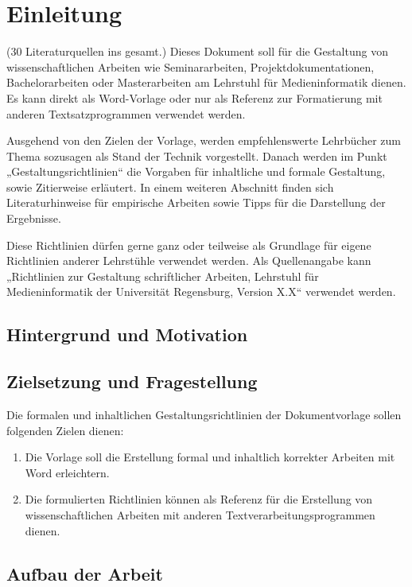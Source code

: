 \chapter{Einleitung}\label{sec:Einleitung}
\pagestyle{headings} %
(30 Literaturquellen ins gesamt.)
Dieses Dokument soll für die Gestaltung von wissenschaftlichen Arbeiten wie Seminararbeiten, Projektdokumentationen, Bachelorarbeiten oder Masterarbeiten am Lehrstuhl für Medieninformatik dienen. Es kann direkt als Word-Vorlage oder nur als Referenz zur Formatierung mit anderen Textsatzprogrammen verwendet werden. 

Ausgehend von den Zielen der Vorlage, werden empfehlenswerte Lehrbücher zum Thema sozusagen als Stand der Technik vorgestellt. Danach werden im Punkt „Gestaltungsrichtlinien“ die Vorgaben für inhaltliche und formale Gestaltung, sowie Zitierweise erläutert. In einem weiteren Abschnitt finden sich Literaturhinweise für empirische Arbeiten sowie Tipps für die Darstellung der Ergebnisse.

Diese Richtlinien dürfen gerne ganz oder teilweise als Grundlage für eigene Richtlinien anderer Lehrstühle verwendet werden. Als Quellenangabe kann „Richtlinien zur Gestaltung schriftlicher Arbeiten, Lehrstuhl für Medieninformatik der Universität Regensburg, Version X.X“ verwendet werden.

\section{Hintergrund und Motivation}

\section{Zielsetzung und Fragestellung}

Die formalen und inhaltlichen Gestaltungsrichtlinien der Dokumentvorlage sollen folgenden Zielen dienen:

\begin{enumerate}
    \item{Die Vorlage soll die Erstellung formal und inhaltlich korrekter Arbeiten mit Word erleichtern.}
    \item{Die formulierten Richtlinien können als Referenz für die Erstellung von wissenschaftlichen Arbeiten mit anderen Textverarbeitungsprogrammen dienen.}
\end{enumerate}

\section{Aufbau der Arbeit}


